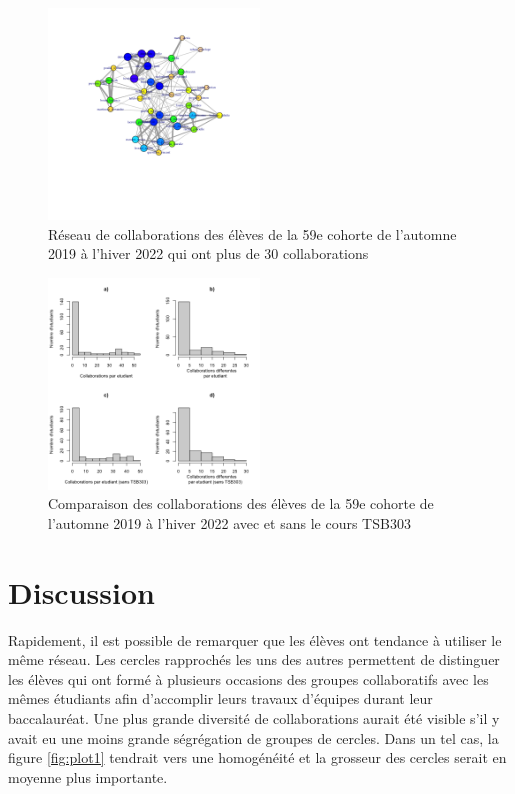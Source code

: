 \documentclass[9pt,twocolumn,twoside,]{pnas-new}
\begin{document}
\begin{figure}
\centering
\includegraphics[width=0.5\textwidth,height=0.4\textheight]{"../results/figure3.png"}
\caption{Réseau de collaborations des élèves de la 59e cohorte de
l'automne 2019 à l'hiver 2022 qui ont plus de 30 collaborations
\label{fig:plot3}}
\end{figure}

\begin{figure}
\centering
\includegraphics[width=0.5\textwidth,height=0.4\textheight]{"../results/figure4.png"}
\caption{Comparaison des collaborations des élèves de la 59e cohorte de
l'automne 2019 à l'hiver 2022 avec et sans le cours TSB303
\label{fig:plot4}}
\end{figure}

\hypertarget{discussion}{%
\section{Discussion}\label{discussion}}

Rapidement, il est possible de remarquer que les élèves ont tendance à
utiliser le même réseau. Les cercles rapprochés les uns des autres
permettent de distinguer les élèves qui ont formé à plusieurs occasions
des groupes collaboratifs avec les mêmes étudiants afin d'accomplir
leurs travaux d'équipes durant leur baccalauréat. Une plus grande
diversité de collaborations aurait été visible s'il y avait eu une moins
grande ségrégation de groupes de cercles. Dans un tel cas, la figure
\ref{fig:plot1} tendrait vers une homogénéité et la grosseur des cercles
serait en moyenne plus importante.
\end{document}
